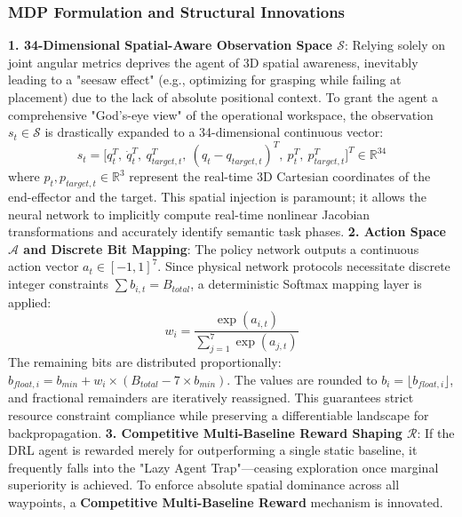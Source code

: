 \subsubsection{MDP Formulation and Structural Innovations}
\noindent\textbf{1. 34-Dimensional Spatial-Aware Observation Space $\mathcal{S}$}: Relying solely on joint angular metrics deprives the agent of 3D spatial awareness, inevitably leading to a "seesaw effect" (e.g., optimizing for grasping while failing at placement) due to the lack of absolute positional context. To grant the agent a comprehensive "God's-eye view" of the operational workspace, the observation $s_t\in\mathcal{S}$ is drastically expanded to a 34-dimensional continuous vector:
\begin{equation}
    s_t = \Big[ q_t^T, \ \dot{q}_t^T, \ q_{target, t}^T, \ (q_t - q_{target, t})^T, \ p_t^T, \ p_{target, t}^T \Big]^T \in \mathbb{R}^{34}
\end{equation}
where $p_t, p_{target, t} \in \mathbb{R}^3$ represent the real-time 3D Cartesian coordinates of the end-effector and the target. 
This spatial injection is paramount; it allows the neural network to implicitly compute real-time nonlinear Jacobian transformations and accurately identify semantic task phases.
\noindent\textbf{2. Action Space $\mathcal{A}$ and Discrete Bit Mapping}: The policy network outputs a continuous action vector $a_t \in [-1, 1]^7$. Since physical network protocols necessitate discrete integer constraints $\sum b_{i,t} = B_{total}$, a deterministic Softmax mapping layer is applied:
\begin{equation}
    w_i = \frac{\exp(a_{i,t})}{\sum_{j=1}^7 \exp(a_{j,t})}
\end{equation}
The remaining bits are distributed proportionally: $b_{float, i} = b_{min} + w_i \times (B_{total} - 7 \times b_{min})$. 
The values are rounded to $b_i=\lfloor b_{float, i} \rfloor$, and fractional remainders are iteratively reassigned. This guarantees strict resource constraint compliance while preserving a differentiable landscape for backpropagation.
\noindent\textbf{3. Competitive Multi-Baseline Reward Shaping $\mathcal{R}$}: If the DRL agent is rewarded merely for outperforming a single static baseline, it frequently falls into the "Lazy Agent Trap"—ceasing exploration once marginal superiority is achieved. To enforce absolute spatial dominance across all waypoints, 
a \textbf{Competitive Multi-Baseline Reward} mechanism is innovated.

